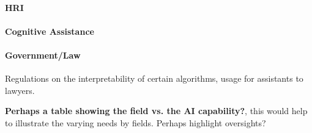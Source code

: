     \paragraph{HRI}
    \paragraph{Cognitive Assistance} 
    \paragraph{Government/Law} Regulations on the interpretability of certain algorithms, usage for assistants to lawyers.

    \textbf{Perhaps a table showing the field vs. the AI capability?}, this would help to illustrate the varying needs by fields. Perhaps highlight oversights?






